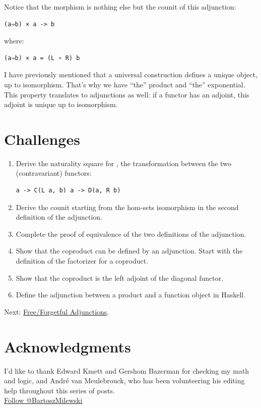 Notice that the  morphism is nothing else but the counit of
this adjunction:

\begin{verbatim}
(a⇒b) × a -> b
\end{verbatim}

where:

\begin{verbatim}
(a⇒b) × a = (L ∘ R) b
\end{verbatim}

I have previously mentioned that a universal construction defines a
unique object, up to isomorphism. That's why we have ``the'' product and
``the'' exponential. This property translates to adjunctions as well: if
a functor has an adjoint, this adjoint is unique up to isomorphism.

\section{Challenges}\label{challenges}

\begin{enumerate}
\item
  Derive the naturality square for , the transformation
  between the two (contravariant) functors:

\begin{verbatim}
a -> C(L a, b) a -> D(a, R b)
\end{verbatim}
\item
  Derive the counit  starting from the hom-sets isomorphism in
  the second definition of the adjunction.
\item
  Complete the proof of equivalence of the two definitions of the
  adjunction.
\item
  Show that the coproduct can be defined by an adjunction. Start with
  the definition of the factorizer for a coproduct.
\item
  Show that the coproduct is the left adjoint of the diagonal functor.
\item
  Define the adjunction between a product and a function object in
  Haskell.
\end{enumerate}

Next:
\href{https://bartoszmilewski.com/2016/06/15/freeforgetful-adjunctions/}{Free/Forgetful
Adjunctions}.

\section{Acknowledgments}\label{acknowledgments}

I'd like to thank Edward Kmett and Gershom Bazerman for checking my math
and logic, and André van Meulebrouck, who has been volunteering his
editing help throughout this series of posts.\\
\href{https://twitter.com/BartoszMilewski}{Follow @BartoszMilewski}
